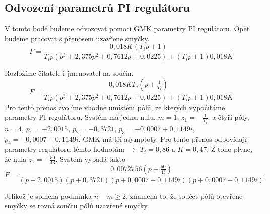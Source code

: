 \documentclass{article}
\begin{document}
		\subsection{Odvození parametrů PI regulátoru}
			V tomto bodě budeme odvozovat pomocí GMK parametry PI regulátoru. Opět budeme pracovat s přenosem uzavřené smyčky.
			\[F=\frac{0,018K(T_ip+1)}{T_ip(p^3 + 2,375 p^2 + 0,7612 p + 0,0225)+(T_ip+1)0,018K}\]

			Rozložíme čitatele i jmenovatel na součin.
			\[F=\frac{0,018KT_i(p+\frac{1}{T_i})}{T_ip(p^3 + 2,375 p^2 + 0,7612 p + 0,0225)+(T_ip+1)0,018K}\]
			Pro tento přenos zvolíme vhodné umístění pólů, ze kterých vypočítáme parametry PI regulátoru. Systém má jednu nulu, $m=1$, $z_1=-\frac{1}{T_i}$, a čtyři póly, $n=4$, $p_1=-2,0015$, $p_2=-0,3721$, $p_3= -0,0007 + 0,1149i$, $p_4= -0,0007 - 0,1149i$. GMK má tři asymptoty. Pro tento přenos odpovídají parametry regulátoru těmto hodnotám $\rightarrow$ $T_i=0,86$ a $K=0,47$. Z toho plyne, že nula $z_1=-\frac{50}{43}$. Systém vypadá takto
			\[F=\frac{0,0072756(p+\frac{50}{43})}{(p+2,0015)(p+0,3721)(p+0,0007 + 0,1149i)(p+0,0007 - 0,1149i)}.\]

			Jelikož je splněna podmínka $n-m \geq 2$, znamená to, že součet pólů otevřené smyčky se rovná součtu pólů uzavřené smyčky.
\end{document}
